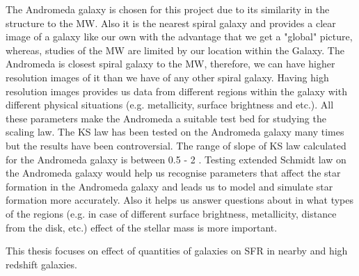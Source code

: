 The Andromeda galaxy is chosen for this project due to its similarity in the structure to the MW. Also it is the nearest spiral galaxy and provides a clear image of a galaxy like our own with the advantage that we get a "global" picture, whereas, studies of the MW are limited by our location within the Galaxy.  The Andromeda is closest spiral galaxy to the MW, therefore, we can have higher resolution images of it than we have of any other spiral galaxy. Having high resolution images provides us data from different regions within the galaxy with different physical situations (e.g. metallicity, surface brightness and etc.). All these parameters make the Andromeda a suitable test bed for studying the scaling law. The KS law has been tested on the Andromeda galaxy many times but the results have been controversial. The range of slope of KS law calculated for the Andromeda galaxy is between 0.5 - 2 \citep[e.g.,][]{Tabatabaei10, Ford13}. Testing extended Schmidt law on the Andromeda galaxy would help us recognise parameters that affect the star formation in the Andromeda galaxy and leads us to model and simulate star formation more accurately. Also it helps us answer questions about in what types of the regions (e.g. in case of different surface brightness, metallicity, distance from the disk, etc.) effect of the stellar mass is more important.

This thesis focuses on effect of quantities of galaxies on SFR in nearby and high redshift galaxies.



 
